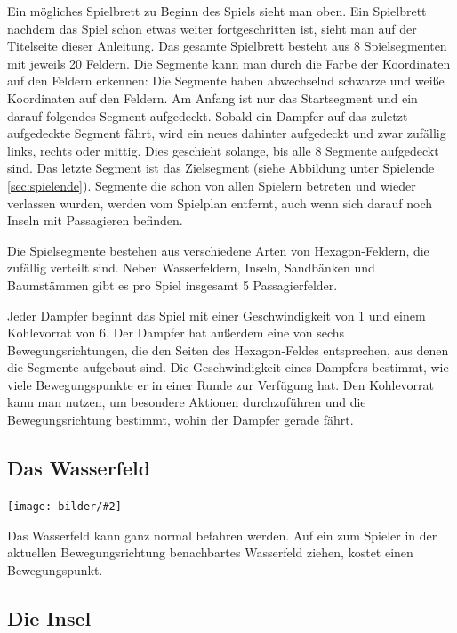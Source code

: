 \documentclass[12pt,a4paper, ngerman, oneside]{scrartcl}
\def\Tiles/{8}
\def\FieldsPerTile/{20}
\def\Passagiere/{5}
\newcommand{\fieldGraphic}[2]{%
\begin{floatingfigure}[#1]{0.15\textwidth}%
  \centering
  \texttt{[image: bilder/\#2]}%
\end{floatingfigure}%
}
\begin{document}
Ein mögliches Spielbrett zu Beginn des Spiels sieht man oben. Ein Spielbrett
nachdem das Spiel schon etwas weiter fortgeschritten ist, sieht man auf der
Titelseite dieser Anleitung. Das gesamte Spielbrett besteht aus \Tiles/
Spielsegmenten mit jeweils \FieldsPerTile/ Feldern. Die Segmente kann man durch
die Farbe der Koordinaten auf den Feldern erkennen: Die Segmente haben
abwechselnd schwarze und weiße Koordinaten auf den Feldern. Am Anfang ist nur
das Startsegment und ein darauf folgendes Segment aufgedeckt. Sobald ein Dampfer
auf das zuletzt aufgedeckte Segment fährt, wird ein neues dahinter aufgedeckt
und zwar zufällig links, rechts oder mittig. Dies geschieht solange, bis alle
\Tiles/ Segmente aufgedeckt sind. Das letzte Segment ist das Zielsegment (siehe
Abbildung unter Spielende \ref{sec:spielende}). Segmente die schon von allen
Spielern betreten und wieder verlassen wurden, werden vom Spielplan entfernt,
auch wenn sich darauf noch Inseln mit Passagieren befinden.

Die Spielsegmente bestehen aus verschiedene Arten von Hexagon-Feldern, die
zufällig verteilt sind. Neben Wasserfeldern, Inseln, Sandbänken und Baumstämmen
gibt es pro Spiel insgesamt \Passagiere/ Passagierfelder.

Jeder Dampfer beginnt das Spiel mit einer Geschwindigkeit von 1 und einem
Kohlevorrat von 6. Der Dampfer hat außerdem eine von sechs Bewegungsrichtungen,
die den Seiten des Hexagon-Feldes entsprechen, aus denen die Segmente aufgebaut
sind. Die Geschwindigkeit eines Dampfers bestimmt, wie viele Bewegungspunkte er
in einer Runde zur Verfügung hat. Den Kohlevorrat kann man nutzen, um besondere
Aktionen durchzuführen und die Bewegungsrichtung bestimmt, wohin der Dampfer
gerade fährt.

\subsection{\label{water}Das Wasserfeld}

\fieldGraphic{r}{wasser}

Das Wasserfeld kann ganz normal befahren werden. Auf ein zum Spieler in der
aktuellen Bewegungsrichtung benachbartes Wasserfeld ziehen, kostet einen
Bewegungspunkt.

\paragraph{}

\subsection{\label{island}Die Insel}
\end{document}
